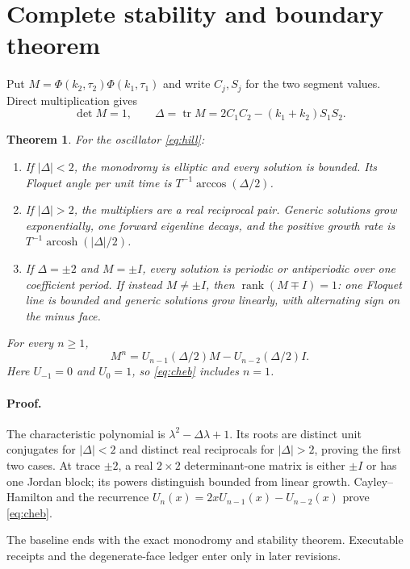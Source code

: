 \documentclass[10pt]{article}
\newtheorem{theorem}{Theorem}
\newcommand{\tr}{\operatorname{tr}}
\newcommand{\rank}{\operatorname{rank}}
\begin{document}
\section{Complete stability and boundary theorem}
Put $M=\Phi(k_2,\tau_2)\Phi(k_1,\tau_1)$ and write $C_j,S_j$ for the
two segment values.  Direct multiplication gives
\begin{equation}
 \det M=1,\qquad
 \Delta=\tr M=2C_1C_2-(k_1+k_2)S_1S_2.                  \label{eq:delta}
\end{equation}

\begin{theorem}\label{thm:atlas}
For the oscillator \eqref{eq:hill}:
\begin{enumerate}
\item If $|\Delta|<2$, the monodromy is elliptic and every solution is
bounded.  Its Floquet angle per unit time is
$T^{-1}\arccos(\Delta/2)$.
\item If $|\Delta|>2$, the multipliers are a real reciprocal pair.  Generic
solutions grow exponentially, one forward eigenline decays, and the positive
growth rate is $T^{-1}\operatorname{arcosh}(|\Delta|/2)$.
\item If $\Delta=\pm2$ and $M=\pm I$, every solution is periodic or
antiperiodic over one coefficient period.  If instead $M\ne\pm I$, then
$\rank(M\mp I)=1$: one Floquet line is bounded and generic solutions grow
linearly, with alternating sign on the minus face.
\end{enumerate}
For every $n\ge1$,
\begin{equation}
 M^n=U_{n-1}(\Delta/2)M-U_{n-2}(\Delta/2)I.              \label{eq:cheb}
\end{equation}
Here $U_{-1}=0$ and $U_0=1$, so \eqref{eq:cheb} includes $n=1$.
\end{theorem}

\paragraph{Proof.}
The characteristic polynomial is $\lambda^2-\Delta\lambda+1$.  Its roots
are distinct unit conjugates for $|\Delta|<2$ and distinct real reciprocals
for $|\Delta|>2$, proving the first two cases.  At trace $\pm2$, a real
$2\times2$ determinant-one matrix is either $\pm I$ or has one Jordan block;
its powers distinguish bounded from linear growth.  Cayley--Hamilton and the
recurrence $U_n(x)=2xU_{n-1}(x)-U_{n-2}(x)$ prove \eqref{eq:cheb}.

\ifnum{}
The baseline ends with the exact monodromy and stability theorem.  Executable
receipts and the degenerate-face ledger enter only in later revisions.
\fi
\end{document}
